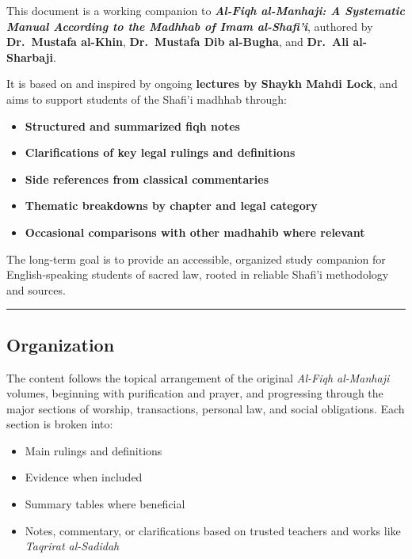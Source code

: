 \documentclass[
  a4paper,
  DIV=11,
  numbers=noendperiod]{scrartcl}
\providecommand{\tightlist}{%
  \setlength{\itemsep}{0pt}\setlength{\parskip}{0pt}}
\begin{document}
This document is a working companion to \textbf{\emph{Al-Fiqh
al-Manhaji: A Systematic Manual According to the Madhhab of Imam
al-Shafi'i}}, authored by \textbf{Dr.~Mustafa al-Khin},
\textbf{Dr.~Mustafa Dib al-Bugha}, and \textbf{Dr.~Ali al-Sharbaji}.

It is based on and inspired by ongoing \textbf{lectures by Shaykh Mahdi
Lock}, and aims to support students of the Shafi'i madhhab through:

\begin{itemize}
\tightlist
\item
  \textbf{Structured and summarized fiqh notes}\\
\item
  \textbf{Clarifications of key legal rulings and definitions}\\
\item
  \textbf{Side references from classical commentaries}\\
\item
  \textbf{Thematic breakdowns by chapter and legal category}\\
\item
  \textbf{Occasional comparisons with other madhahib where relevant}
\end{itemize}

The long-term goal is to provide an accessible, organized study
companion for English-speaking students of sacred law, rooted in
reliable Shafi'i methodology and sources.

\begin{center}\rule{0.5\linewidth}{0.5pt}\end{center}

\subsection{Organization}\label{organization}

The content follows the topical arrangement of the original
\emph{Al-Fiqh al-Manhaji} volumes, beginning with purification and
prayer, and progressing through the major sections of worship,
transactions, personal law, and social obligations. Each section is
broken into:

\begin{itemize}
\tightlist
\item
  Main rulings and definitions\\
\item
  Evidence when included\\
\item
  Summary tables where beneficial\\
\item
  Notes, commentary, or clarifications based on trusted teachers and
  works like \emph{Taqrirat al-Sadidah}
\end{itemize}
\end{document}
